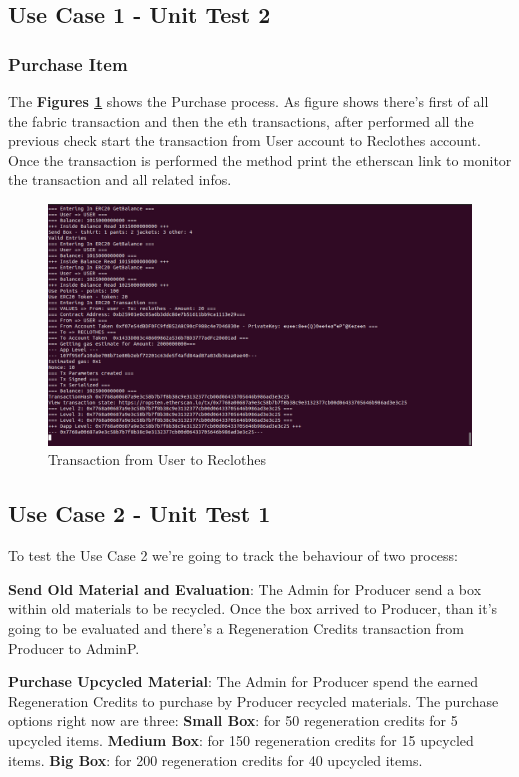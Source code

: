 \subsection{Use Case 1 - Unit Test 2}

\subsubsection{Purchase Item}

The \textbf{Figures \ref{fig:tx-user-reclothes}} shows the Purchase process. As figure shows
there's first of all the fabric transaction and then the eth transactions, after performed all
the previous check start the transaction from User account to Reclothes account. Once the 
transaction is performed the method print the etherscan link to monitor the transaction and
all related infos. 

\begin{figure}[h!]
	\centering
    \includegraphics[totalheight=7cm]{img/test/test2/tx-user-reclothes.png}
	\caption{Transaction from User to Reclothes}
	\label{fig:tx-user-reclothes}
\end{figure}


\subsection{Use Case 2 - Unit Test 1}

To test the Use Case 2 we're going to track the behaviour of two process:

\begin{outline}
    \1 \textbf{Send Old Material and Evaluation}: The Admin for Producer send a box within old materials
    to be recycled. Once the box arrived to Producer, than it's going to be evaluated and there's a 
    Regeneration Credits transaction from Producer to AdminP.

    \1 \textbf{Purchase Upcycled Material}: The Admin for Producer spend the earned Regeneration Credits
    to purchase by Producer recycled materials. The purchase options right now are three:
    \2 \textbf{Small Box}: for 50 regeneration credits for 5 upcycled items.
    \2 \textbf{Medium Box}: for 150 regeneration credits for 15 upcycled items.
    \2 \textbf{Big Box}: for 200 regeneration credits for 40 upcycled items.
\end{outline}

